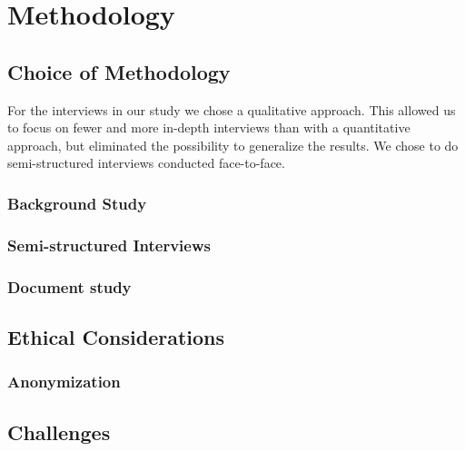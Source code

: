 \chapter{Methodology}

\section{Choice of Methodology}

For the interviews in our study we chose a qualitative approach. This allowed us to focus on fewer and more in-depth interviews than with a quantitative approach, but eliminated the possibility to generalize the results. We chose to do semi-structured interviews conducted face-to-face. 

\subsection{Background Study}


\subsection{Semi-structured Interviews}
\subsection{Document study}

\section{Ethical Considerations}
\subsection{Anonymization}

\section{Challenges}